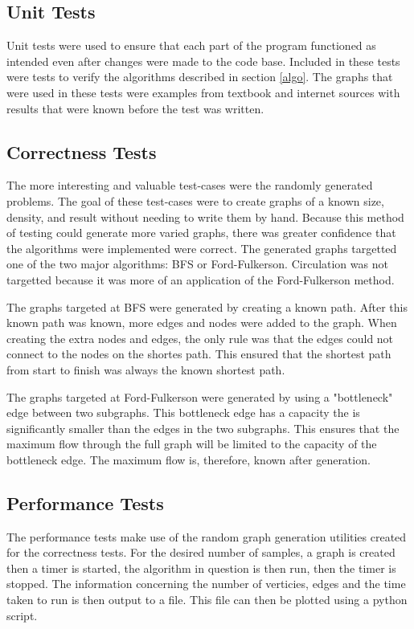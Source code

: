 \documentclass[conference]{IEEEtran}
\begin{document}
\subsection{Unit Tests}
Unit tests were used to ensure that each part of the program functioned as intended even after
changes were made to the code base. Included in these tests were tests to verify the algorithms
described in section \ref{algo}. The graphs that were used in these tests were examples from 
textbook and internet sources with results that were known before the test was written. 

\subsection{Correctness Tests}
The more interesting and valuable test-cases were the randomly generated problems. The goal
of these test-cases were to create graphs of a known size, density, and result without needing
to write them by hand. Because this method of testing could generate more varied graphs, there 
was greater confidence that the algorithms were implemented were correct. The generated graphs 
targetted one of the two major algorithms: BFS or Ford-Fulkerson. Circulation was not targetted
because it was more of an application of the Ford-Fulkerson method.

The graphs targeted at BFS were generated by creating a known path. After this known path was
known, more edges and nodes were added to the graph. When creating the extra nodes and edges, 
the only rule was that the edges could not connect to the nodes on the shortes path. This 
ensured that the shortest path from start to finish was always the known shortest path. 

The graphs targeted at Ford-Fulkerson were generated by using a "bottleneck" edge between 
two subgraphs. This bottleneck edge has a capacity the is significantly smaller than the 
edges in the two subgraphs. This ensures that the maximum flow through the full graph
will be limited to the capacity of the bottleneck edge. The maximum flow is, therefore, 
known after generation.

\subsection{Performance Tests} %
The performance tests make use of the random graph generation utilities created for the 
correctness tests. For the desired number of samples, a graph is created then a timer is
started, the algorithm in question is then run, then the timer is stopped. The information
concerning the number of verticies, edges and the time taken to run is then output to a 
file. This file can then be plotted using a python script. 
\end{document}
